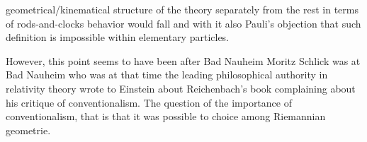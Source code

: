 \documentclass[draft]{article}
\begin{document}
geometrical/kinematical structure of the theory separately from the rest in terms of rods-and-clocks behavior would fall and with it also Pauli's objection that such definition is impossible within elementary particles.

However, this point seems to have been after Bad Nauheim Moritz Schlick was at Bad Nauheim who was at that time the leading philosophical authority in relativity theory wrote to Einstein about Reichenbach's book complaining about his critique of conventionalism. The question of the importance of conventionalism, that is that it was possible to choice among Riemannian geometrie. 


\end{document}
